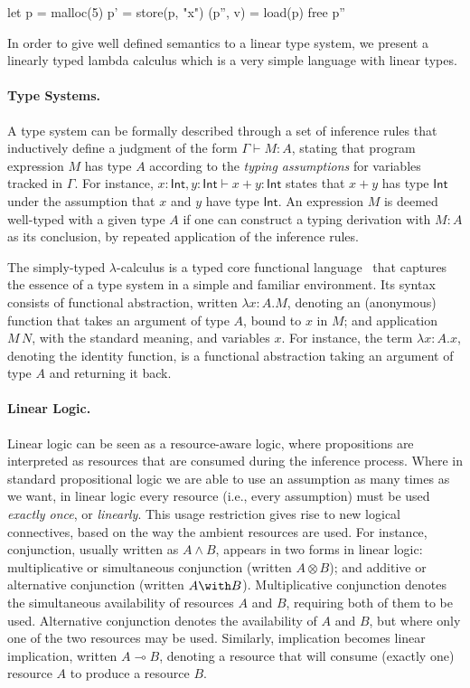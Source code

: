 \documentclass[a4paper, draft]{report}
\newcommand{\mypara}[1]{\paragraph{\textbf{#1}.}}
\newcommand{\lolli}{\multimap}
\newcommand{\tensor}{\otimes}
\begin{document}
\begin{code}
let p = malloc(5)
    p' = store(p, "x")
    (p'', v) = load(p)
    free p''
\end{code}


In order to give well defined semantics to a linear type system, we present a
linearly typed lambda calculus which is a very simple language with linear
types.




\mypara{Type Systems} A type system can be formally described through
a set of inference rules that inductively define a judgment of the
form $\Gamma \vdash M : A$, stating that program expression $M$ has
type $A$ according to the \emph{typing assumptions} for variables
tracked in $\Gamma$. For instance,
$x{:}\mathsf{Int}, y{:}\mathsf{Int} \vdash x+y : \mathsf{Int}$ states
that $x+y$ has type $\mathsf{Int}$ under the assumption that $x$ and
$y$ have type $\mathsf{Int}$.  An expression $M$ is deemed well-typed
with a given type $A$ if one can construct a typing derivation with $M :
A$ as its conclusion, by repeated application of the inference rules.

The simply-typed $\lambda$-calculus is a typed core functional
language~\cite{10.5555/509043} that captures the essence of a type system in a simple and familiar environment. Its syntax consists of
functional abstraction, written $\lambda x{:}A.M$, denoting
an (anonymous) function that takes an argument of type $A$, bound to
$x$ in $M$; and application $M\,N$, with the standard meaning, and
variables $x$. For instance, the term $\lambda x{:}A.x$, denoting the identity function, is a functional abstraction
taking an argument of type $A$ and returning it back.

\mypara{Linear Logic}

Linear logic \cite{DBLP:journals/tcs/Girard87} can be seen as a
resource-aware logic, where propositions are interpreted as resources
that are consumed during the inference process.  Where in standard
propositional logic we are able to use an assumption as many times as
we want, in linear logic every resource (i.e., every assumption) must
be used \emph{exactly once}, or \emph{linearly}. This usage
restriction gives rise to new logical connectives, based on the way
the ambient resources are used. For instance, conjunction, usually
written as $A\wedge B$, appears in two forms in linear logic:
multiplicative or simultaneous conjunction (written $A\tensor B$); and
additive or alternative conjunction (written $A\with
B$). Multiplicative conjunction denotes the simultaneous availability
of resources $A$ and $B$, requiring both of them to be
used. Alternative conjunction denotes the availability of $A$ and $B$,
but where only one of the two resources may be used. Similarly,
implication becomes linear implication, written $A\lolli B$,
denoting a resource that will consume (exactly one) resource $A$ to
produce a resource $B$.
\end{document}
